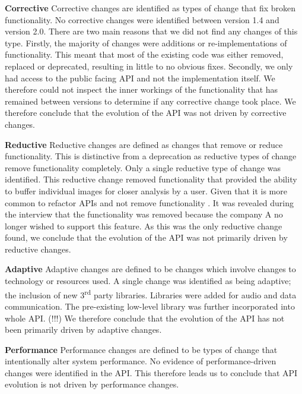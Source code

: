 \documentclass{sig-alternate}
\begin{document}
\smallskip \noindent
\textbf{Corrective  }
Corrective changes are identified as types of change that fix broken functionality.
No corrective changes were identified between version 1.4 and version 2.0. There are two main reasons that we did not find any changes of this type. Firstly, the majority of changes were additions or re-implementations of functionality. This meant that most of the existing code was either removed, replaced or deprecated, resulting in little to no obvious fixes. Secondly, we only had access to the public facing API and not the implementation itself. We therefore could not inspect the inner workings of the functionality that has remained between versions to determine if any corrective change took place.
We therefore conclude that the evolution of the API was not driven by corrective changes.

\smallskip \noindent
\textbf{Reductive  }
Reductive changes are defined as changes that remove or reduce functionality. This is distinctive from a deprecation as reductive types of change remove functionality completely.
Only a single reductive type of change was identified. This reductive change removed functionality that provided the ability to buffer individual images for closer analysis by a user. Given that it is more common to refactor APIs and not remove functionality \cite{dig2005role, xing2006refactoring}. It was revealed during the interview that the functionality was removed because the company A no longer wished to support this feature. 
As this was the only reductive change found, we conclude that the evolution of the API was not primarily driven by reductive changes.

\smallskip \noindent
\textbf{Adaptive  }
Adaptive changes are defined to be changes which involve changes to technology or resources used. 
A single change was identified as being adaptive; the inclusion of new 3\textsuperscript{rd} party libraries. Libraries were added for audio and data communication. The pre-existing low-level library was further incorporated into whole API. (!!!)
We therefore conclude that the evolution of the API has not been primarily driven by adaptive changes.

\smallskip \noindent
\textbf{Performance  }
Performance changes are defined to be types of change that intentionally alter system performance.
No evidence of performance-driven changes were identified in the API.
This therefore leads us to conclude that API evolution is not driven by performance changes.
\end{document}
